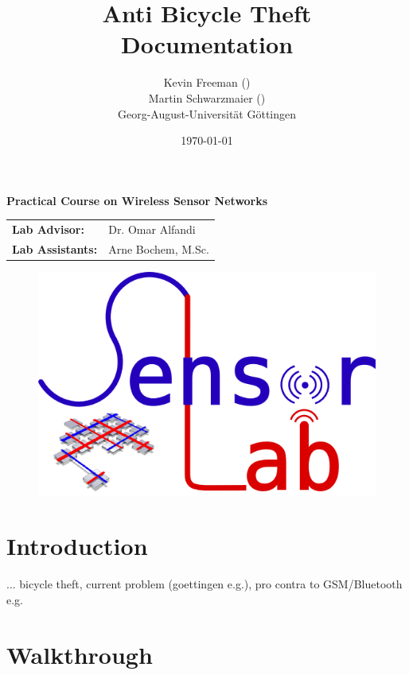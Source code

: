 \documentclass[a4paper]{article}
\title{\textbf{Anti Bicycle Theft}\bigskip\\Documentation}
\author{Kevin Freeman (\matone)\\ Martin Schwarzmaier (\mattwo)\\Georg-August-Universität Göttingen}
\date{\today}
\begin{document}
\setlength\parindent{0pt}
\maketitle
\begin{center}
	\textbf{Practical Course on Wireless Sensor Networks}
\end{center}\vspace{10em}
\begin{center}
	\begin{tabular}{ll}
	\textbf{Lab Advisor: }&Dr. Omar Alfandi\\
	\textbf{Lab Assistants: }&Arne Bochem, M.Sc.
	\end{tabular}
\end{center}

\begin{figure}[b]
	\centering
	\includegraphics[scale=1]{logo.png} %
\end{figure}

\thispagestyle{empty} %
\newpage

\tableofcontents
\thispagestyle{empty} %
\newpage

\setcounter{page}{1} %

\section{Introduction}
... bicycle theft, current problem (goettingen e.g.), pro contra to GSM/Bluetooth e.g.

\section{Walkthrough}
\end{document}
